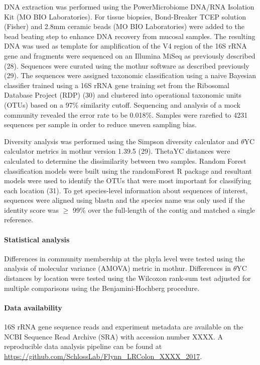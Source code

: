 \documentclass[11pt,]{article}
\let\oldparagraph\paragraph
\renewcommand{\paragraph}[1]{\oldparagraph{#1}\mbox{}}
\begin{document}
DNA extraction was performed using the PowerMicrobiome DNA/RNA Isolation
Kit (MO BIO Laboratories). For tissue biopsies, Bond-Breaker TCEP
solution (Fisher) and 2.8mm ceramic beads (MO BIO Laboratories) were
added to the bead beating step to enhance DNA recovery from mucosal
samples. The resulting DNA was used as template for amplification of the
V4 region of the 16S rRNA gene and fragments were sequenced on an
Illumina MiSeq as previously described (28). Sequences were curated
using the mothur software as described previously (29). The sequences
were assigned taxonomic classification using a naive Bayesian classifier
trained using a 16S rRNA gene training set from the Ribosomal Database
Project (RDP) (30) and clustered into operational taxonomic units (OTUs)
based on a 97\% similarity cutoff. Sequencing and analysis of a mock
community revealed the error rate to be 0.018\%. Samples were rarefied
to 4231 sequences per sample in order to reduce uneven sampling bias.

Diversity analysis was performed using the Simpson diversity calculator
and \(\theta\)YC calculator metrics in mothur version 1.39.5 (29).
ThetaYC distances were calculated to determine the dissimilarity between
two samples. Random Forest classification models were built using the
randomForest R package and resultant models were used to identify the
OTUs that were most important for classifying each location (31). To get
species-level information about sequences of interest, sequences were
aligned using blastn and the species name was only used if the identity
score was \(\ge\) 99\% over the full-length of the contig and matched a
single reference.

\paragraph{Statistical analysis}\label{statistical-analysis}

Differences in community membership at the phyla level were tested using
the analysis of molecular variance (AMOVA) metric in mothur. Differences
in \(\theta\)YC distances by location were tested using the Wilcoxon
rank-sum test adjusted for multiple comparisons using the
Benjamini-Hochberg procedure.

\paragraph{Data availability}\label{data-availability}

16S rRNA gene sequence reads and experiment metadata are available on
the NCBI Sequence Read Archive (SRA) with accession number XXXX. A
reproducible data analysis pipeline can be found at
\url{https://github.com/SchlossLab/Flynn_LRColon_XXXX_2017}.
\end{document}
